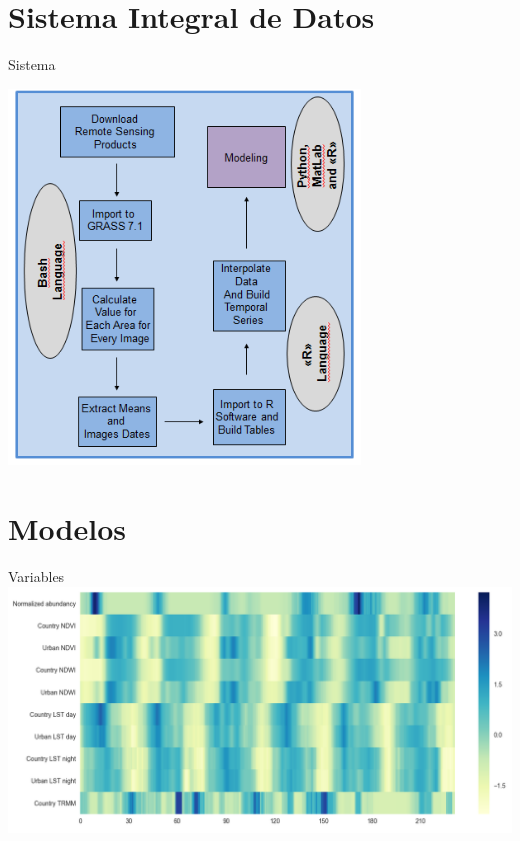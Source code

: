 \documentclass[10pt]{beamer}
\begin{document}
\section{Sistema Integral de Datos}
\begin{frame}{Sistema}
  \begin{center}
    \includegraphics[width=0.7\textwidth]{sistema.png}
  \end{center}

\end{frame}


\section{Modelos}

\begin{frame}{Variables}
  \includegraphics[width=1\textwidth]{all_variables.png}


\end{frame}
\end{document}
